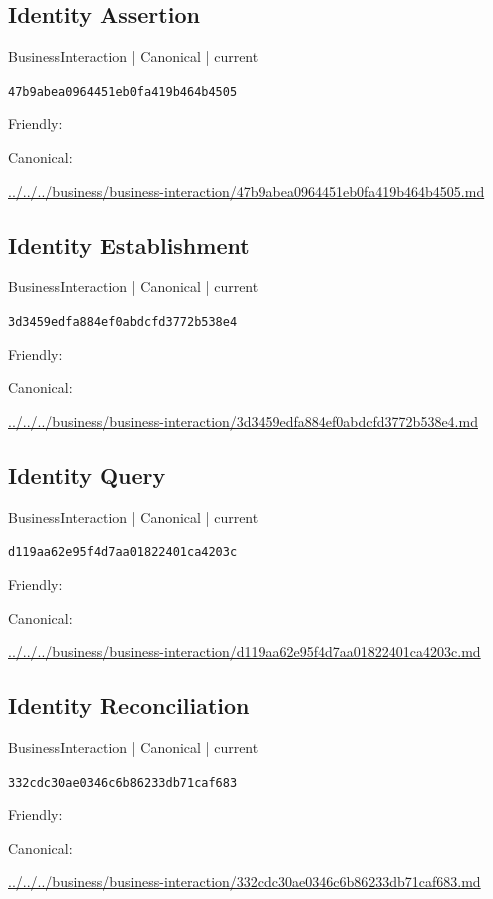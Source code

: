\documentclass[10pt,a4paper]{article}
\begin{document}
\subsection*{Identity Assertion}
{\small BusinessInteraction | Canonical | current}\par
\texttt{47b9abea0964451eb0fa419b464b4505}\par
Friendly: \par
Canonical: \par
{\footnotesize\url{../../../business/business-interaction/47b9abea0964451eb0fa419b464b4505.md}}\par
\subsection*{Identity Establishment}
{\small BusinessInteraction | Canonical | current}\par
\texttt{3d3459edfa884ef0abdcfd3772b538e4}\par
Friendly: \par
Canonical: \par
{\footnotesize\url{../../../business/business-interaction/3d3459edfa884ef0abdcfd3772b538e4.md}}\par
\subsection*{Identity Query}
{\small BusinessInteraction | Canonical | current}\par
\texttt{d119aa62e95f4d7aa01822401ca4203c}\par
Friendly: \par
Canonical: \par
{\footnotesize\url{../../../business/business-interaction/d119aa62e95f4d7aa01822401ca4203c.md}}\par
\subsection*{Identity Reconciliation}
{\small BusinessInteraction | Canonical | current}\par
\texttt{332cdc30ae0346c6b86233db71caf683}\par
Friendly: \par
Canonical: \par
{\footnotesize\url{../../../business/business-interaction/332cdc30ae0346c6b86233db71caf683.md}}\par
\end{document}
